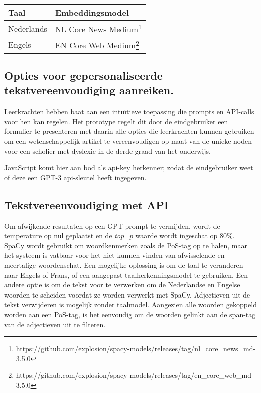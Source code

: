 \begin{center}
	\begin{tabular}{ | m{4cm} | m{12cm} | } 
		\hline
		\textbf{Taal} & \textbf{Embeddingsmodel} \\
		\hline
		Nederlands & NL Core News Medium\footnote{https://github.com/explosion/spacy-models/releases/tag/nl_core_news_md-3.5.0} \\ 
		\hline
		Engels & EN Core Web Medium\footnote{https://github.com/explosion/spacy-models/releases/tag/en_core_web_md-3.5.0} \\
		\hline
	\end{tabular}
	\label{table:wordembeddings-spacy}
\end{center}

\subsection{Opties voor gepersonaliseerde tekstvereenvoudiging aanreiken.}

Leerkrachten hebben baat aan een intuïtieve toepassing die prompts en API-calls voor hen kan regelen. Het prototype regelt dit door de eindgebruiker een formulier te presenteren met daarin alle opties die leerkrachten kunnen gebruiken om een wetenschappelijk artikel te vereenvoudigen op maat van de unieke noden voor een scholier met dyslexie in de derde graad van het onderwijs. 

JavaScript komt hier aan bod als api-key herkenner; zodat de eindgebruiker weet of deze een GPT-3 api-sleutel heeft ingegeven.




\subsection{Tekstvereenvoudiging met API}

Om afwijkende resultaten op een GPT-prompt te vermijden, wordt de temperature op nul geplaatst en de \textit{top\_p} waarde wordt ingeschat op 80\%. SpaCy wordt gebruikt om woordkenmerken zoals de PoS-tag op te halen, maar het systeem is vatbaar voor het niet kunnen vinden van afwisselende en meertalige woordenschat. Een mogelijke oplossing is om de taal te veranderen naar Engels of Frans, of een aangepast taalherkenningsmodel te gebruiken. Een andere optie is om de tekst voor te verwerken om de Nederlandse en Engelse woorden te scheiden voordat ze worden verwerkt met SpaCy. Adjectieven uit de tekst verwijderen is mogelijk zonder taalmodel. Aangezien alle woorden gekoppeld worden aan een PoS-tag, is het eenvoudig om de woorden gelinkt aan de span-tag van de adjectieven uit te filteren.

